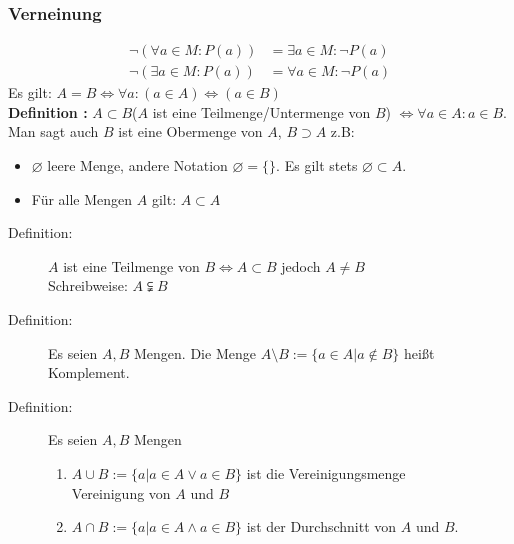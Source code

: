 \subsubsection{Verneinung}
\begin{align*}
\neg (\forall a \in M : P(a)) &= \exists a \in M : \neg P(a)\\
\neg (\exists a \in M: P(a)) &= \forall a \in M: \neg P(a)
\end{align*}
Es gilt: $A=B\Leftrightarrow\forall a: (a \in A) \Leftrightarrow (a \in B)$\\
\textbf{Definition :} $A \subset B$(\glqq $A$ ist eine Teilmenge/Untermenge von $B$\grqq) $\Leftrightarrow \forall a \in A: a \in B$. Man sagt auch $B$ ist eine Obermenge von $A$, $B \supset A$ z.B:
\begin{itemize}
\item $\varnothing$ leere Menge, andere Notation $\varnothing = \{\}$. Es gilt stets $\varnothing \subset A$.
\item Für alle Mengen $A$ gilt: $A\subset A$
\end{itemize}
\begin{description}
\item[Definition:] $A$ ist eine Teilmenge von $B \Leftrightarrow A \subset B$ jedoch $A \neq B$\\Schreibweise: $A \subsetneqq B$
\item[Definition:] Es seien $A,B$ Mengen. Die Menge $A \setminus B := \{a\in A | a \notin B\}$ heißt Komplement.
\item[Definition:] Es seien $A,B$ Mengen
	\begin{enumerate}
		\item $A \cup B := \{a|a\in A \vee a \in B \}$ ist die Vereinigungsmenge\\ Vereinigung von $A$ und $B$
		\item $A \cap B := \{a|a\in A \wedge a \in B \}$ ist der Durchschnitt von $A$ und $B$.
	\end{enumerate} 
\end{description}
\def\firstcircle{(0,0) circle (1.5cm)}
\def\secondcircle{(0:2cm) circle (1.5cm)}



\setlength{\parskip}{5mm}

